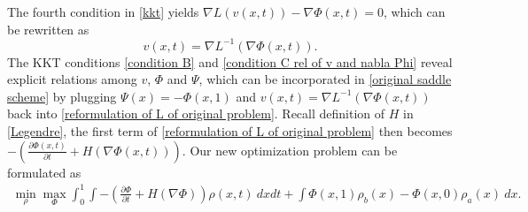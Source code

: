 \documentclass{article}
\begin{document}
The fourth condition in \eqref{kkt} yields $\nabla L({v}(x, t)) -\nabla\Phi(x,t) = 0$, 
which can be rewritten as
\begin{equation}
  {v}(x,t) = \nabla L^{-1} (\nabla\Phi(x,t)).  \label{condition C  rel of v and nabla Phi}
\end{equation}
The KKT conditions \eqref{condition B} and \eqref{condition C  rel of v and nabla Phi} reveal explicit relations among ${v}$, $\Phi$ and $\Psi$, which can be incorporated in \eqref{original saddle scheme} by plugging $\Psi(x) = -\Phi(x,1)$ and ${v}(x,t) = \nabla L^{-1}(\nabla\Phi(x,t))$ back into \eqref{reformulation of L of original problem}. 
Recall definition of $H$ in \eqref{Legendre}, the first term of \eqref{reformulation of L of original problem} then becomes $-\left(\frac{\partial\Phi(x,t)}{\partial t}+H(\nabla \Phi(x,t))\right)$. Our new optimization problem can be formulated as
\begin{align}
  \min_{\rho}\max_{\Phi}
\int_0^1\int -\left(\frac{\partial\Phi}{\partial t}+H(\nabla \Phi)\right) \rho(x,t)~dxdt  + \int\Phi(x,1)\rho_b(x) - \Phi(x,0)\rho_a(x)~dx.
\label{functional L}
\end{align}
\end{document}
